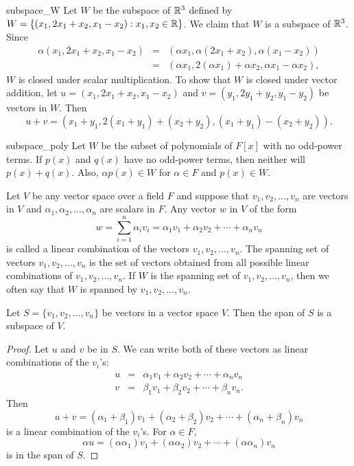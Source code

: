 
\begin{example}{subspace_W}
Let $W$ be the subspace of ${\Bbb R}^3$ defined by $W = \{ (x_1, 2 x_1
+ x_2, x_1 - x_2) : x_1, x_2 \in {\Bbb R} \}$. We claim that $W$ is a 
subspace of ${\Bbb R}^3$.  Since 
\begin{eqnarray*}
\alpha (x_1, 2 x_1 + x_2, x_1 - x_2) 
& = & (\alpha x_1, \alpha(2 x_1 + x_2), \alpha( x_1 - x_2)) \\
& = & (\alpha x_1, 2(\alpha x_1) + \alpha x_2, \alpha x_1 -\alpha x_2),
\end{eqnarray*}
$W$ is closed under scalar multiplication. To show that $W$ is closed
under vector addition, let $u = (x_1, 2 x_1 + x_2, x_1 - x_2)$ and $v
= (y_1, 2 y_1 + y_2, y_1 - y_2)$ be vectors in $W$. Then
\[
u + v = 
(x_1 + y_1, 2( x_1 + y_1) +( x_2 + y_2), (x_1 + y_1) - (x_2+ y_2)).
\]
\end{example}
 
 
 
\begin{example}{subspace_poly}
Let $W$ be the subset of polynomials of $F[x]$ with no odd-power
terms. If $p(x)$ and $q(x)$ have no odd-power terms, then neither will 
$p(x) + q(x)$.  Also, $\alpha p(x) \in W$ for $\alpha \in F$ and $p(x)
\in W$.
\end{example}
  

Let $V$ be any vector space over a field $F$ and suppose that $v_1,
v_2, \ldots, v_n$ are vectors in $V$ and $\alpha_1, \alpha_2, \ldots,
\alpha_n$ are scalars in $F$. Any vector $w$ in $V$ of the form
\[
w = \sum_{i=1}^n \alpha_i v_i = \alpha_1 v_1 + \alpha_2 v_2 + \cdots + \alpha_n v_n
\]
is called a {\bfi linear combination\/} of the
vectors $v_1, v_2, \ldots, v_n$. The {\bfi spanning
set\/} of vectors $v_1, v_2, \ldots, v_n$ is the
set of vectors obtained from all possible linear combinations of
$v_1, v_2, \ldots, v_n$. If $W$ is the spanning set of $v_1, v_2,
\ldots, v_n$, then we often say that $W$ is {\bfi spanned\/} by $v_1,
v_2, \ldots, v_n$. 
 
 
\begin{proposition}
Let $S= \{v_1, v_2, \ldots, v_n \}$ be vectors in a vector space $V$.
Then the span of $S$ is a subspace of $V$. 
\end{proposition}


\begin{proof}
Let $u$ and $v$ be in $S$. We can write both of these vectors as 
linear combinations of the $v_i$'s:
\begin{eqnarray*}
u & = & \alpha_1 v_1 + \alpha_2 v_2 + \cdots + \alpha_n v_n \\
v & = & \beta_1 v_1 + \beta_2 v_2 + \cdots + \beta_n v_n.
\end{eqnarray*}
Then
\[
u+ v =( \alpha_1 + \beta_1) v_1 + (\alpha_2+ \beta_2) v_2 + \cdots +
(\alpha_n + \beta_n) v_n 
\]
is a linear combination of the $v_i$'s. For $\alpha \in F$,
\[
\alpha u = (\alpha \alpha_1) v_1 + ( \alpha \alpha_2) v_2 + \cdots +
(\alpha \alpha_n ) v_n 
\]
is in the span of $S$.
\end{proof}


